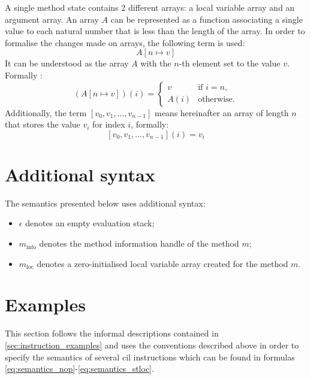 \documentclass[declaration,shortabstract,english,mgr]{iithesis}
\newcommand{\setarrayitem}[3] {
	#1[#2 \mapsto #3]
}
\begin{document}
A single method state contains 2 different arrays: a local variable array and an argument array. An array $A$ can be represented as a function associating a single value to each natural number that is less than the length of the array. In order to formalise the changes made on arrays, the following term is used:
\begin{equation}
\label{eq:array_change}
	\setarrayitem{A}{n}{v}
\end{equation}
It can be understood as the array $A$ with the $n$-th element set to the value $v$. Formally \cite{zychlaThesis}:
\begin{equation}
\label{eq:array_change_formal}
	(\setarrayitem{A}{n}{v})(i) =
	\begin{cases}
		v		& \text{if } i = n,\\
		A(i)	& \text{otherwise.}
	\end{cases}
\end{equation}
Additionally, the term $[v_0, v_1, ..., v_{n - 1}]$ means hereinafter an array of length $n$ that stores the value $v_i$ for index $i$, formally:
\begin{equation}
\label{eq:array_v1_vn}
	[v_0, v_1, ..., v_{n - 1}](i) = v_i
\end{equation}

\section{Additional syntax}

The semantics presented below uses additional syntax:
\begin{itemize}
	\item{$\epsilon$ denotes an empty evaluation stack;}
	\item{$m_{\text{info}}$ denotes the method information handle of the method $m$;}
	\item{$m_{\text{loc}}$ denotes a zero-initialised local variable array created for the method $m$.}
\end{itemize}

\section{Examples}

This section follows the informal descriptions contained in \ref{sec:instruction_examples} and uses the conventions described above in order to specify the semantics of several \acrshort{cil} instructions which can be found in formulas \ref{eq:semantics_nop}-\ref{eq:semantics_stloc}.
\end{document}
